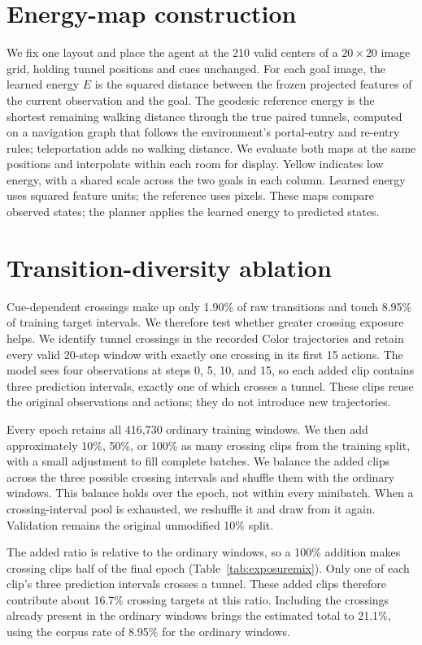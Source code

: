 \section{Energy-map construction}
\label{app:landscapes}

We fix one layout and place the agent at the 210 valid centers of a
$20\times20$ image grid, holding tunnel positions and cues unchanged.
For each goal image, the learned energy $E$ is the squared distance between
the frozen projected features of the current observation and the goal.
The geodesic reference energy is the shortest remaining walking distance
through the true paired tunnels, computed on a navigation graph that follows
the environment's portal-entry and re-entry rules; teleportation adds no
walking distance. We evaluate both maps at the same positions and interpolate
within each room for display. Yellow indicates low energy, with a shared
scale across the two goals in each column. Learned energy uses squared
feature units; the reference uses pixels. These maps compare observed states;
the planner applies the learned energy to predicted states. 

\FloatBarrier
\section{Transition-diversity ablation}
\label{app:exposure}
Cue-dependent crossings make up only 1.90\% of raw transitions and touch
8.95\% of training target intervals. We therefore test whether greater
crossing exposure helps. We identify tunnel crossings in the recorded
Color trajectories and retain every valid 20-step window with exactly one
crossing in its first 15 actions. The model sees four observations at
steps 0, 5, 10, and 15, so each added clip contains three prediction
intervals, exactly one of which crosses a tunnel. These clips reuse the
original observations and actions; they do not introduce new trajectories.

Every epoch retains all 416,730 ordinary training windows. We then add
approximately 10\%, 50\%, or 100\% as many crossing clips from the training
split, with a small adjustment to fill complete batches. We balance the
added clips across the three possible crossing intervals and shuffle them
with the ordinary windows. This balance holds over the epoch, not within
every minibatch. When a crossing-interval pool is exhausted, we reshuffle
it and draw from it again. Validation remains the original unmodified
10\% split.

The added ratio is relative to the ordinary windows, so a 100\% addition
makes crossing clips half of the final epoch (Table~\ref{tab:exposuremix}).
Only one of each clip's three prediction intervals crosses a tunnel.
These added clips therefore contribute about 16.7\% crossing targets at
this ratio. Including the crossings already present in the ordinary
windows brings the estimated total to 21.1\%, using the corpus rate of
8.95\% for the ordinary windows.

